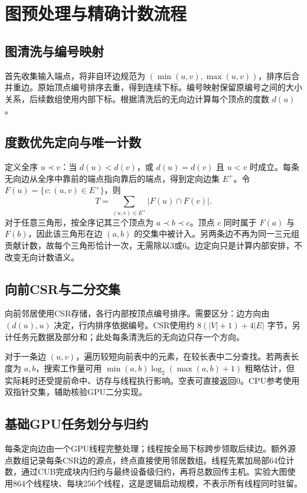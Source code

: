 \section{图预处理与精确计数流程}
\subsection{图清洗与编号映射}
首先收集输入端点，将非自环边规范为 $(\min(u,v),\max(u,v))$，排序后合并重边。原始顶点编号排序去重，得到连续下标。编号映射保留原编号之间的大小关系，后续数组使用内部下标。根据清洗后的无向边计算每个顶点的度数 $d(u)$。

\subsection{度数优先定向与唯一计数}
定义全序 $u\prec v$：当 $d(u)<d(v)$，或 $d(u)=d(v)$ 且 $u<v$ 时成立。每条无向边从全序中靠前的端点指向靠后的端点，得到定向边集 $E^+$。令 $F(u)=\{v:(u,v)\in E^+\}$，则
\begin{equation}
T=\sum_{(u,v)\in E^+}|F(u)\cap F(v)|.
\label{eq:triangle}
\end{equation}
对于任意三角形，按全序记其三个顶点为 $a\prec b\prec c$。顶点 $c$ 同时属于 $F(a)$ 与 $F(b)$，因此该三角形在边 $(a,b)$ 的交集中被计入。另两条边不再为同一三元组贡献计数，故每个三角形恰计一次，无需除以3或6。边定向只是计算内部安排，不改变无向计数语义。

\subsection{向前CSR与二分交集}
向前邻居使用CSR存储，各行内部按顶点编号排序。需要区分：边方向由 $(d(u),u)$ 决定，行内排序依据编号。CSR使用约 $8(|V|+1)+4|E|$ 字节，另计任务元数据及部分和；此处每条清洗后的无向边只存一个方向。

对于一条边 $(u,v)$，遍历较短向前表中的元素，在较长表中二分查找。若两表长度为 $a,b$，搜索工作量可用 $\min(a,b)\log_2(\max(a,b)+1)$ 粗略估计，但实际耗时还受提前命中、访存与线程执行影响。空表可直接返回0。CPU参考使用双指针交集，辅助核验GPU二分实现。

\subsection{基础GPU任务划分与归约}
每条定向边由一个GPU线程完整处理；线程按全局下标跨步领取后续边。额外源点数组记录每条CSR边的源点，终点直接使用邻居数组。线程先累加局部64位计数，通过CUB完成块内归约与最终设备级归约，再将总数回传主机。实验大图使用864个线程块、每块256个线程，这是逻辑启动规模，不表示所有线程同时驻留。
